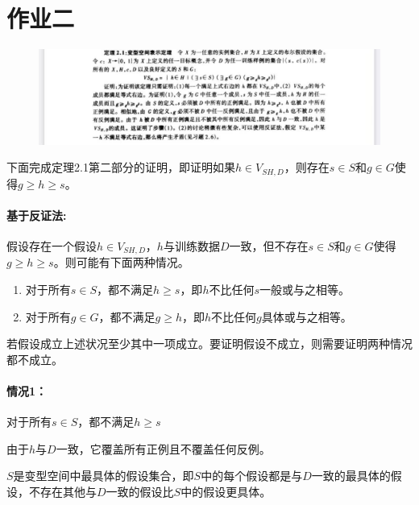 \documentclass{article}
\begin{document}
\section{作业二}

   \begin{figure}[!h]
       \centering
       \includegraphics[width=1.2\linewidth]{image/2.6.jpg}
       \label{2.6}
   \end{figure}

    下面完成定理2.1第二部分的证明，即证明如果\(h\in V_{SH,D}\)，则存在\(s\in S\)和\(g\in G\)使得\(g\geq h\geq s\)。
    
   \paragraph{基于反证法:}

    假设存在一个假设\(h\in V_{SH,D}\)，\(h\)与训练数据\(D\)一致，但不存在\(s\in S\)和\(g\in G\)使得\(g\geq h\geq s\)。则可能有下面两种情况。

    \begin{enumerate}
       
        \item 对于所有\(s\in S\)，都不满足\(h\geq s\)，即\(h\)不比任何\(s\)一般或与之相等。
    
        \item 对于所有\(g\in G\)，都不满足\(g\geq h\)，即\(h\)不比任何\(g\)具体或与之相等。

    \end{enumerate}

    若假设成立上述状况至少其中一项成立。要证明假设不成立，则需要证明两种情况都不成立。

   \paragraph{情况1：}对于所有\(s\in S\)，都不满足\(h\geq s\)
    
    由于\(h\)与\(D\)一致，它覆盖所有正例且不覆盖任何反例。
    
    \(S\)是变型空间中最具体的假设集合，即\(S\)中的每个假设都是与\(D\)一致的最具体的假设，不存在其他与\(D\)一致的假设比\(S\)中的假设更具体。
\end{document}
